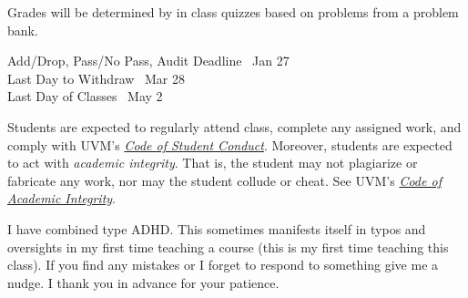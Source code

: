 \documentclass[11pt, letterpaper]{article}
\theoremstyle{definition}
\theoremstyle{remark}
\begin{document}
Grades will be determined by in class quizzes based on problems from a problem bank. 
\vspace{1em}

\begin{center} 
	\begin{minipage}{3.8in}
		\begin{flushleft}
			Add/Drop, Pass/No Pass, Audit Deadline \dotfill ~Jan 27 \\
			Last Day to Withdraw \dotfill ~Mar 28 \\
			Last Day of Classes \dotfill ~May 2 \\
		\end{flushleft}
	\end{minipage}
\end{center}
\vspace{1em}



\vspace{1em}

 Students are expected to regularly attend class, complete any assigned work, and comply with UVM's \href{http://www.uvm.edu/policies/student/studentcode.pdf}{{\em Code of Student Conduct}}.
Moreover, students are expected to act with {\em academic integrity}. That is, the student may not plagiarize or fabricate any work, nor may the student collude or cheat. See UVM's \href{https://www.uvm.edu/policies/student/acadintegrity.pdf}{{\em Code of Academic Integrity}}.
\vspace{1em}

 I have combined type ADHD. 
This sometimes manifests itself in typos and oversights in my first time teaching a course (this is my first time teaching this class). 
If you find any mistakes or I forget to respond to something give me a nudge.
I thank you in advance for your patience.
\vspace{1em}
\end{document}
